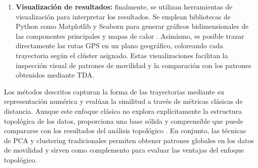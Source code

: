 \begin{enumerate}
\vspace{3cm}

\item \textbf{Visualización de resultados:} finalmente, se utilizan herramientas de visualización para interpretar los resultados. Se emplean bibliotecas de Python como Matplotlib y Seaborn para generar gráficos bidimensionales de las componentes principales y mapas de calor \cite{refMatplotlib} \cite{refSeaborn}. Asimismo, es posible trazar directamente las rutas GPS en un plano geográfico, coloreando cada trayectoria según el clúster asignado. Estas visualizaciones facilitan la inspección visual de patrones de movilidad y la comparación con los patrones obtenidos mediante TDA.
\end{enumerate} Los métodos descritos capturan la forma de las trayectorias mediante su representación numérica y evalúan la similitud a través de métricas clásicas de distancia. Aunque este enfoque clásico no explora explícitamente la estructura topológica de los datos, proporciona una base sólida y comprensible que puede compararse con los resultados del análisis topológico \cite{refComparison}. En conjunto, las técnicas de PCA y clustering tradicionales permiten obtener patrones globales en los datos de movilidad y sirven como complemento para evaluar las ventajas del enfoque topológico.
